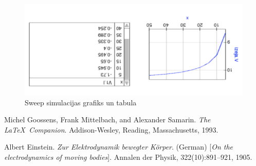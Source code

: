 \documentclass{report}
\begin{document}
    \begin{figure}[!htb]
    \centering
        \includegraphics[scale=0.5, angle=180]{tab.png}
        \caption{Sweep simulacijas grafiks un tabula}
        \label{fig:my_label}
    \end{figure}
\newpage
\renewcommand{\bibname}{Literatūras saraksts}
\begin{thebibliography}{9}
Michel Goossens, Frank Mittelbach, and Alexander Samarin. 
\textit{The \LaTeX\ Companion}. 
Addison-Wesley, Reading, Massachusetts, 1993.
 
Albert Einstein. 
\textit{Zur Elektrodynamik bewegter K{\"o}rper}. (German) 
[\textit{On the electrodynamics of moving bodies}]. 
Annalen der Physik, 322(10):891–921, 1905.
 
\end{thebibliography}
\end{document}
